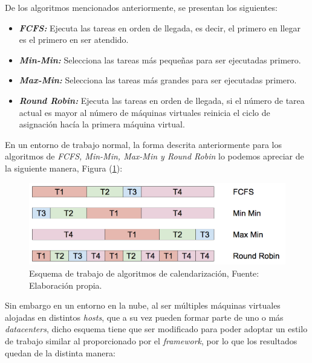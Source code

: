 De los algoritmos mencionados anteriormente, se presentan los siguientes:


\begin{itemize}
	\item \textit{\textbf{FCFS:}} Ejecuta las tareas en orden de llegada, es decir, el primero en llegar es el primero en ser atendido.
	\item \textit{\textbf{Min-Min:}} Selecciona las tareas m\'as pequeñas para ser ejecutadas primero.
	\item  \textit{\textbf{Max-Min:}} Selecciona las tareas m\'as grandes para ser ejecutadas primero.
	\item \textit{\textbf{Round Robin:}} Ejecuta las tareas en orden de llegada, si el número de tarea actual es mayor al número de máquinas virtuales reinicia el ciclo de asignación hacía la primera máquina virtual.
\end{itemize}

En un entorno de trabajo normal, la forma descrita anteriormente para los algoritmos de \textit{FCFS, Min-Min, Max-Min y Round Robin} lo podemos apreciar de la siguiente manera, Figura (\ref{fig:cuatro}):


\setcounter{figure}{3}
\renewcommand\thefigure{\arabic{figure}}
\begin{figure}[H]
	\centering
	\includegraphics[scale=0.4]{media/NuevoEsquema}
	\caption{Esquema de trabajo de algoritmos de calendarizaci\'on, Fuente: Elaboraci\'on propia.}
	\label{fig:cuatro}
\end{figure}


Sin embargo en un entorno en la nube, al ser m\'ultiples m\'aquinas virtuales alojadas en distintos \textit{hosts}, que a su vez pueden formar parte de uno o m\'as \textit{datacenters}, dicho esquema tiene que ser modificado para poder adoptar un estilo de trabajo similar al proporcionado por el \textit{framework}, por lo que los resultados quedan de la distinta manera:


